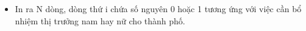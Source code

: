 \begin{itemize}
	\item In ra N dòng, dòng thứ i chứa số nguyên 0 hoặc 1 tương ứng với việc cần bổ nhiệm thị trưởng nam hay nữ cho thành phố.
\end{itemize}